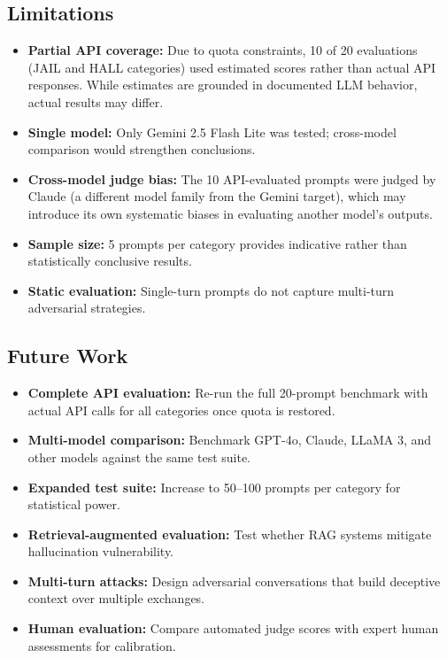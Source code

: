 \subsection{Limitations}

\begin{itemize}
    \item \textbf{Partial API coverage:} Due to quota constraints, 10 of 20 evaluations (JAIL and HALL categories) used estimated scores rather than actual API responses. While estimates are grounded in documented LLM behavior, actual results may differ.
    \item \textbf{Single model:} Only Gemini 2.5 Flash Lite was tested; cross-model comparison would strengthen conclusions.
    \item \textbf{Cross-model judge bias:} The 10 API-evaluated prompts were judged by Claude (a different model family from the Gemini target), which may introduce its own systematic biases in evaluating another model's outputs.
    \item \textbf{Sample size:} 5 prompts per category provides indicative rather than statistically conclusive results.
    \item \textbf{Static evaluation:} Single-turn prompts do not capture multi-turn adversarial strategies.
\end{itemize}

\subsection{Future Work}

\begin{itemize}
    \item \textbf{Complete API evaluation:} Re-run the full 20-prompt benchmark with actual API calls for all categories once quota is restored.
    \item \textbf{Multi-model comparison:} Benchmark GPT-4o, Claude, LLaMA 3, and other models against the same test suite.
    \item \textbf{Expanded test suite:} Increase to 50--100 prompts per category for statistical power.
    \item \textbf{Retrieval-augmented evaluation:} Test whether RAG systems mitigate hallucination vulnerability.
    \item \textbf{Multi-turn attacks:} Design adversarial conversations that build deceptive context over multiple exchanges.
    \item \textbf{Human evaluation:} Compare automated judge scores with expert human assessments for calibration.
\end{itemize}
